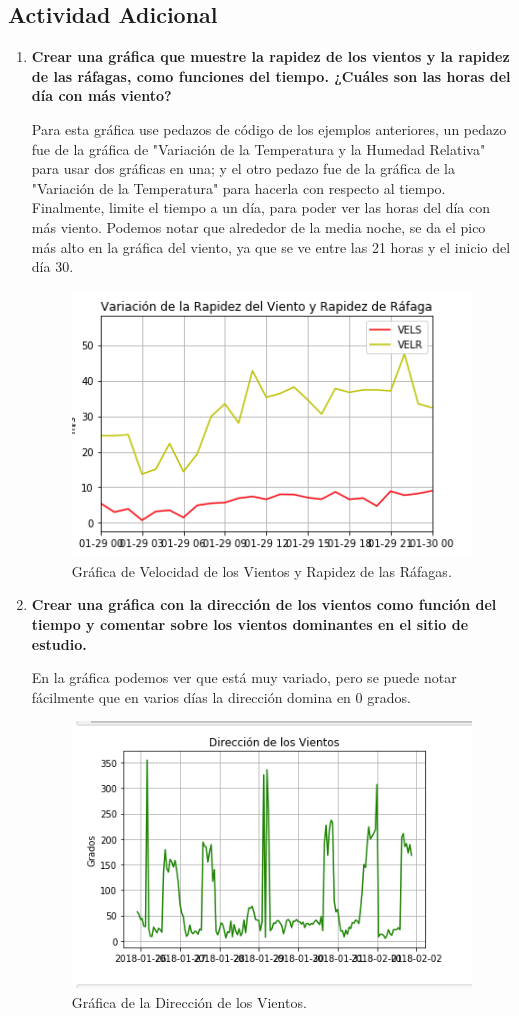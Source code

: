 \documentclass[a4paper]{article}
\begin{document}
\subsection{Actividad Adicional}
\begin{enumerate}
\item\textbf{Crear una gráfica que muestre la rapidez de los vientos y la rapidez de las ráfagas, como funciones del tiempo. ¿Cuáles son las horas del día con más viento?}

Para esta gráfica use pedazos de código de los ejemplos anteriores, un pedazo fue de la gráfica de "Variación de la Temperatura y la Humedad Relativa" para usar dos gráficas en una; y el otro pedazo fue de la gráfica de la "Variación de la Temperatura" para hacerla con respecto al tiempo. Finalmente, limite el tiempo a un día, para poder ver las horas del día con más viento. Podemos notar que alrededor de la media noche, se da el pico más alto en la gráfica del viento, ya que se ve entre las 21 horas y el inicio del día 30.

\begin{figure}[h!]
  \centering
  \includegraphics[width=0.6\linewidth]{ActGraf1.png}
  \caption{Gráfica de Velocidad de los Vientos y Rapidez de las Ráfagas.}
\end{figure}


\item\textbf{Crear una gráfica con la dirección de los vientos como función del tiempo y comentar sobre los vientos dominantes en el sitio de estudio.}

En la gráfica podemos ver que está muy variado, pero se puede notar fácilmente que en varios días la dirección domina en 0 grados. 

\begin{figure}[h!]
  \centering
  \includegraphics[width=0.6\linewidth]{ActGraf2.png}
  \caption{Gráfica de la Dirección de los Vientos.}
\end{figure}



\end{enumerate}
\end{document}
